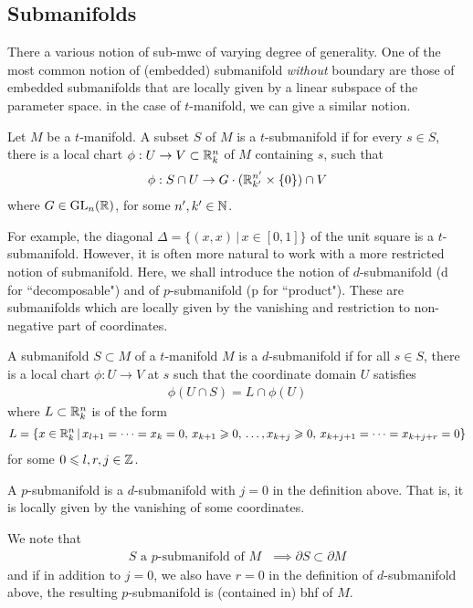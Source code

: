 \documentclass{article}
\begin{document}
\subsection{Submanifolds} 
There a various notion of sub-mwc of varying degree of generality. One of the most common notion of (embedded) submanifold \emph{without} boundary are those of embedded submanifolds that are locally given by a linear subspace of the parameter space. in the case of $t$-manifold, we can give a similar notion. 

\begin{fdefinition}[$t$-submanifold] 
Let $M$ be a $t$-manifold. A subset $S$ of $M$ is a $t$-submanifold if for every $s \in S$, there is a local chart $\phi: U \to V \subset {\ensuremath {\mathbb R}}^n_k$ of $M$ containing $s$, such that
\begin{align*}
\phi: S \cap U \to G \cdot ({\mathbb R}^{n'}_{k'} \times \{0\}) \cap V
\end{align*}
where $G \in \mathrm{GL}_n({\mathbb R})$, for some $n', k' \in {\ensuremath {\mathbb N}}$. 
\end{fdefinition}

For example, the diagonal $\Delta = \{(x, x) \, |\, x \in [0, 1]\}$ of the unit square is a $t$-submanifold. However, it is often more natural to work with a more restricted notion of submanifold. Here, we shall introduce the notion of $d$-submanifold (d for ``decomposable") and of $p$-submanifold (p for ``product"). These are submanifolds which are locally given by the vanishing and restriction to non-negative part of coordinates. 

\begin{fdefinition}[$d$-submanifold] 
A submanifold $S \subset M$ of a $t$-manifold $M$ is a $d$-submanifold if for all $s \in S$, there is a local chart $\phi: U \to V$ at $s$ such that the coordinate domain $U$ satisfies 
\begin{align*}
\phi(U \cap S) = L \cap \phi(U)
\end{align*}
where $L \subset {\ensuremath {\mathbb R}}^n_k$ is of the form 
\begin{align*}
L = \{x \in {\ensuremath {\mathbb R}}^n_k \, |\, x_{l + 1} = \dots = x_k = 0, \, x_{k + 1} \geqslant 0, \, \dots, x_{k + j} \geqslant 0, \, x_{k + j + 1} = \dots = x_{k + j + r} = 0\} 
\end{align*}
for some $0 \leqslant l, r, j \in {\ensuremath {\mathbb Z}}$. 
\end{fdefinition}

\begin{fdefinition}[$p$-submanifold]
A $p$-submanifold is a $d$-submanifold with $j = 0$ in the definition above. That is, it is locally given by the vanishing of some coordinates. 
\end{fdefinition}
We note that 
\begin{align*}
S \text{ a $p$-submanifold of $M$ } \implies \partial S \subset \partial M
\end{align*}
and if in addition to $j = 0$, we also have $r = 0$ in the definition of $d$-submanifold above, the resulting $p$-submanifold is (contained in) bhf of $M$. 
\end{document}
